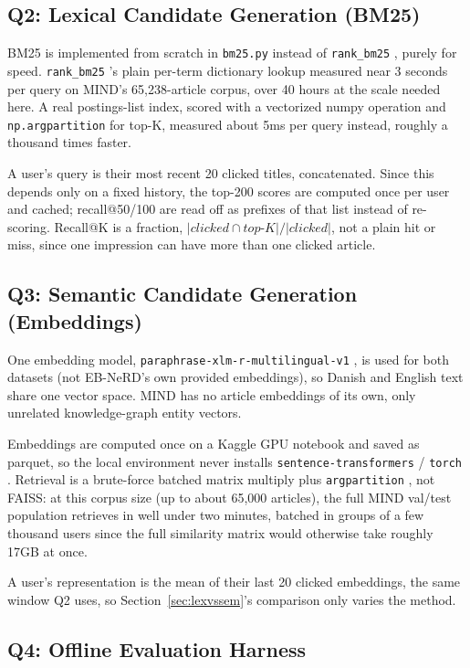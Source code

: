 \documentclass[11pt]{article}
\newcommand{\code}[1]{%
    \colorbox{gray!40}{\texttt{#1}}%
}
\begin{document}
\subsection{Q2: Lexical Candidate Generation (BM25)}

BM25 is implemented from scratch in \code{bm25.py} instead of \code{rank\_bm25}, purely for
speed. \code{rank\_bm25}'s plain per-term dictionary lookup measured near 3 seconds per query on
MIND's 65,238-article corpus, over 40 hours at the scale needed here. A real postings-list index,
scored with a vectorized numpy operation and \code{np.argpartition} for top-K, measured about
5ms per query instead, roughly a thousand times faster.

A user's query is their most recent 20 clicked titles, concatenated. Since this depends only on
a fixed history, the top-200 scores are computed once per user and cached; recall@50/100 are
read off as prefixes of that list instead of re-scoring. Recall@K is a fraction,
$|clicked \cap top\text{-}K| / |clicked|$, not a plain hit or miss, since one impression can
have more than one clicked article.

\subsection{Q3: Semantic Candidate Generation (Embeddings)}

One embedding model, \code{paraphrase-xlm-r-multilingual-v1}, is used for both datasets (not
EB-NeRD's own provided embeddings), so Danish and English text share one vector space. MIND has
no article embeddings of its own, only unrelated knowledge-graph entity vectors.

Embeddings are computed once on a Kaggle GPU notebook and saved as parquet, so the local
environment never installs \code{sentence-transformers}/\code{torch}. Retrieval is a
brute-force batched matrix multiply plus \code{argpartition}, not FAISS: at this corpus size (up
to about 65,000 articles), the full MIND val/test population retrieves in well under two
minutes, batched in groups of a few thousand users since the full similarity matrix would
otherwise take roughly 17GB at once.

A user's representation is the mean of their last 20 clicked embeddings, the same window Q2
uses, so Section~\ref{sec:lexvssem}'s comparison only varies the method.

\subsection{Q4: Offline Evaluation Harness}
\end{document}
